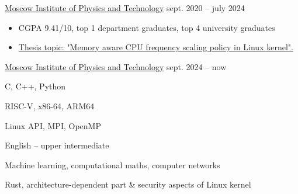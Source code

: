         {\href{https://mipt.ru}{Moscow Institute of Physics and Technology}}
        {sept. 2020 -- july 2024}{}

    \begin{itemize}
        \item CGPA 9.41/10, top 1 department graduates, top 4 university graduates
        \item \href{https://github.com/Vokerlee/macfm-governor-thesis}
                   {Thesis topic: "Memory aware CPU frequency scaling policy in Linux kernel".}
    \end{itemize}

        {\href{https://mipt.ru}{Moscow Institute of Physics and Technology}}
        {sept. 2024 -- now}{}


    C, C++, Python
    \smallskip

    RISC-V, x86-64, ARM64
    \smallskip

    Linux API, MPI, OpenMP
    \smallskip

    English -- upper intermediate

    Machine learning, computational maths, computer networks
    \smallskip

    Rust, architecture-dependent part \& security aspects of Linux kernel
    \smallskip


    \vspace{-1mm}
    \vspace{-1mm}
